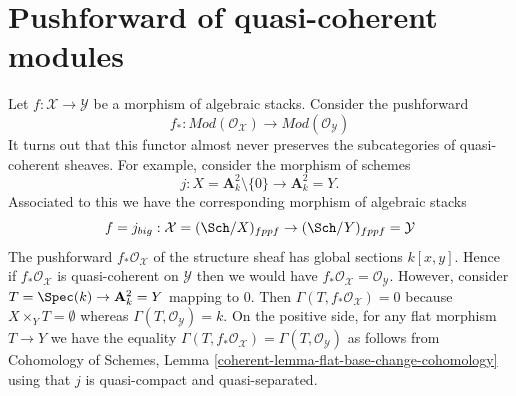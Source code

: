 \section{Pushforward of quasi-coherent modules}
\label{stacks-cohomology-section-pushforward-quasi-coherent}
Let $f : \mathcal{X} \to \mathcal{Y}$ be a morphism of algebraic stacks.
Consider the pushforward
$$
f_* :
\textit{Mod}(\mathcal{O}_\mathcal{X})
\longrightarrow
\textit{Mod}(\mathcal{O}_\mathcal{Y})
$$
It turns out that this functor almost never preserves the subcategories
of quasi-coherent sheaves. For example, consider the morphism of schemes
$$
j : X = \mathbf{A}^2_k \setminus \{0\} \longrightarrow \mathbf{A}^2_k = Y.
$$
Associated to this we have the corresponding morphism of algebraic stacks
$$
f = j_{big} : \mathcal{X} = (\Sch/X)_{fppf} \to
(\Sch/Y)_{fppf} = \mathcal{Y}
$$
The pushforward $f_*\mathcal{O}_\mathcal{X}$ of the structure sheaf has
global sections $k[x, y]$. Hence if $f_*\mathcal{O}_\mathcal{X}$ is
quasi-coherent on $\mathcal{Y}$ then we would have
$f_*\mathcal{O}_\mathcal{X} = \mathcal{O}_\mathcal{Y}$. However,
consider $T = \Spec(k) \to \mathbf{A}^2_k = Y$ mapping to $0$.
Then $\Gamma(T, f_*\mathcal{O}_\mathcal{X}) = 0$ because
$X \times_Y T = \emptyset$ whereas $\Gamma(T, \mathcal{O}_\mathcal{Y}) = k$.
On the positive side, for any flat morphism $T \to Y$ we have the equality
$\Gamma(T, f_*\mathcal{O}_\mathcal{X}) = \Gamma(T, \mathcal{O}_\mathcal{Y})$
as follows from
Cohomology of Schemes, Lemma \ref{coherent-lemma-flat-base-change-cohomology}
using that $j$ is quasi-compact and quasi-separated.

